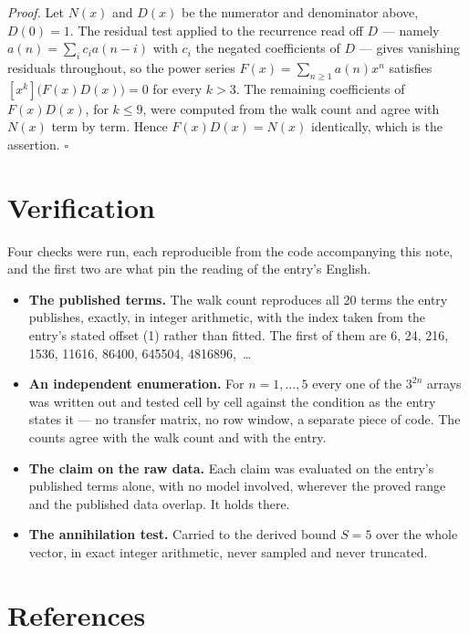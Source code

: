 \documentclass[11pt]{article}
\theoremstyle{definition}
\begin{document}
{\itshape Proof.} Let $N(x)$ and $D(x)$ be the numerator and denominator above, $D(0)=1$. The residual test applied to the recurrence read off $D$ --- namely $a(n) = \sum_i c_i a(n-i)$ with $c_i$ the negated coefficients of $D$ --- gives vanishing residuals throughout, so the power series $F(x)=\sum_{n\ge 1}a(n)x^n$ satisfies $[x^k]\bigl(F(x)D(x)\bigr) = 0$ for every $k > 3$. The remaining coefficients of $F(x)D(x)$, for $k \le 9$, were computed from the walk count and agree with $N(x)$ term by term. Hence $F(x)D(x) = N(x)$ identically, which is the assertion. $\square$

\section{Verification}

Four checks were run, each reproducible from the code accompanying this note, and the first two are what pin the reading of the entry's English.

\begin{itemize}

\item {\bfseries The published terms.} The walk count reproduces all 20 terms the entry publishes, exactly, in integer arithmetic, with the index taken from the entry's stated offset (1) rather than fitted. The first of them are 6, 24, 216, 1536, 11616, 86400, 645504, 4816896,~\dots

\item {\bfseries An independent enumeration.} For $n = 1,\dots,5$ every one of the $3^{2n}$ arrays was written out and tested cell by cell against the condition as the entry states it --- no transfer matrix, no row window, a separate piece of code. The counts agree with the walk count and with the entry.

\item {\bfseries The claim on the raw data.} Each claim was evaluated on the entry's published terms alone, with no model involved, wherever the proved range and the published data overlap. It holds there.

\item {\bfseries The annihilation test.} Carried to the derived bound $S = 5$ over the whole vector, in exact integer arithmetic, never sampled and never truncated.

\end{itemize}

\section{References}
\end{document}
